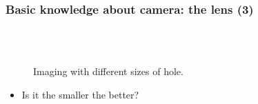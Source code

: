 \begin{frame}
 \frametitle{Basic knowledge about camera: the lens (3)}
  \vspace{-0.1in}
\begin{figure}
\begin{center}
	 \hspace{0.08in}
	 \\
	 \hspace{0.08in}
	\\ 
\end{center}
\caption{Imaging with different sizes of hole.}
\end{figure}
\begin{itemize}
	\item {Is it the smaller the better?}
\end{itemize}
\end{frame}

